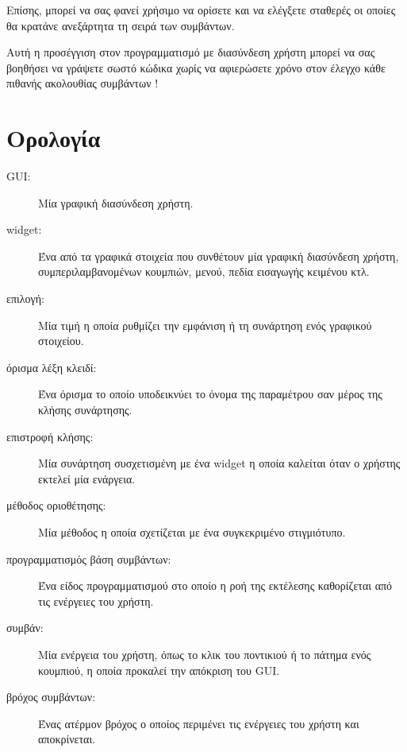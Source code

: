 \documentclass[10pt]{book}
\begin{document}
 Επίσης, μπορεί να σας φανεί χρήσιμο να ορίσετε και να ελέγξετε σταθερές οι οποίες θα 
κρατάνε ανεξάρτητα τη σειρά των συμβάντων.

Αυτή η προσέγγιση στον προγραμματισμό με διασύνδεση χρήστη μπορεί να σας βοηθήσει να γράψετε 
σωστό κώδικα χωρίς να αφιερώσετε χρόνο στον έλεγχο κάθε πιθανής ακολουθίας συμβάντων !



 
\section{Ορολογία}

\begin{description} 

\item[GUI:]  Μία γραφική διασύνδεση χρήστη. 

\item[widget:]  Ένα από τα γραφικά στοιχεία που συνθέτουν μία γραφική διασύνδεση χρήστη, 
συμπεριλαμβανομένων κουμπιών, μενού, πεδία εισαγωγής κειμένου κτλ.

\item[επιλογή:] Μία τιμή η οποία ρυθμίζει την εμφάνιση ή τη συνάρτηση ενός γραφικού στοιχείου.

\item[όρισμα λέξη κλειδί:] Ένα όρισμα το οποίο υποδεικνύει το όνομα της παραμέτρου σαν μέρος 
της κλήσης συνάρτησης.

\item[επιστροφή κλήσης:] Μία συνάρτηση συσχετισμένη με ένα  widget  η οποία καλείται 
όταν ο χρήστης εκτελεί μία ενάργεια.

\item[μέθοδος οριοθέτησης:] Μία μέθοδος η οποία σχετίζεται με ένα συγκεκριμένο στιγμιότυπο.

\item[προγραμματισμός βάση συμβάντων:] Ένα είδος προγραμματισμού στο οποίο η ροή της εκτέλεσης 
καθορίζεται από τις ενέργειες του χρήστη.

\item[συμβάν:] Μία ενέργεια του χρήστη, όπως το κλικ του ποντικιού ή το πάτημα ενός κουμπιού, 
η οποία προκαλεί την απόκριση του  GUI. 

\item[βρόχος συμβάντων:] Ένας ατέρμον βρόχος ο οποίος περιμένει τις ενέργειες του χρήστη και 
αποκρίνεται.


\end{description}
\end{document}
